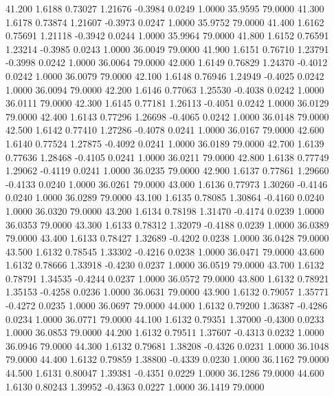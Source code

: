   41.200   1.6188   0.73027   1.21676  -0.3984   0.0249   1.0000  35.9595  79.0000
  41.300   1.6178   0.73874   1.21607  -0.3973   0.0247   1.0000  35.9752  79.0000
  41.400   1.6162   0.75691   1.21118  -0.3942   0.0244   1.0000  35.9964  79.0000
  41.800   1.6152   0.76591   1.23214  -0.3985   0.0243   1.0000  36.0049  79.0000
  41.900   1.6151   0.76710   1.23791  -0.3998   0.0242   1.0000  36.0064  79.0000
  42.000   1.6149   0.76829   1.24370  -0.4012   0.0242   1.0000  36.0079  79.0000
  42.100   1.6148   0.76946   1.24949  -0.4025   0.0242   1.0000  36.0094  79.0000
  42.200   1.6146   0.77063   1.25530  -0.4038   0.0242   1.0000  36.0111  79.0000
  42.300   1.6145   0.77181   1.26113  -0.4051   0.0242   1.0000  36.0129  79.0000
  42.400   1.6143   0.77296   1.26698  -0.4065   0.0242   1.0000  36.0148  79.0000
  42.500   1.6142   0.77410   1.27286  -0.4078   0.0241   1.0000  36.0167  79.0000
  42.600   1.6140   0.77524   1.27875  -0.4092   0.0241   1.0000  36.0189  79.0000
  42.700   1.6139   0.77636   1.28468  -0.4105   0.0241   1.0000  36.0211  79.0000
  42.800   1.6138   0.77749   1.29062  -0.4119   0.0241   1.0000  36.0235  79.0000
  42.900   1.6137   0.77861   1.29660  -0.4133   0.0240   1.0000  36.0261  79.0000
  43.000   1.6136   0.77973   1.30260  -0.4146   0.0240   1.0000  36.0289  79.0000
  43.100   1.6135   0.78085   1.30864  -0.4160   0.0240   1.0000  36.0320  79.0000
  43.200   1.6134   0.78198   1.31470  -0.4174   0.0239   1.0000  36.0353  79.0000
  43.300   1.6133   0.78312   1.32079  -0.4188   0.0239   1.0000  36.0389  79.0000
  43.400   1.6133   0.78427   1.32689  -0.4202   0.0238   1.0000  36.0428  79.0000
  43.500   1.6132   0.78545   1.33302  -0.4216   0.0238   1.0000  36.0471  79.0000
  43.600   1.6132   0.78666   1.33918  -0.4230   0.0237   1.0000  36.0519  79.0000
  43.700   1.6132   0.78791   1.34535  -0.4244   0.0237   1.0000  36.0572  79.0000
  43.800   1.6132   0.78921   1.35153  -0.4258   0.0236   1.0000  36.0631  79.0000
  43.900   1.6132   0.79057   1.35771  -0.4272   0.0235   1.0000  36.0697  79.0000
  44.000   1.6132   0.79200   1.36387  -0.4286   0.0234   1.0000  36.0771  79.0000
  44.100   1.6132   0.79351   1.37000  -0.4300   0.0233   1.0000  36.0853  79.0000
  44.200   1.6132   0.79511   1.37607  -0.4313   0.0232   1.0000  36.0946  79.0000
  44.300   1.6132   0.79681   1.38208  -0.4326   0.0231   1.0000  36.1048  79.0000
  44.400   1.6132   0.79859   1.38800  -0.4339   0.0230   1.0000  36.1162  79.0000
  44.500   1.6131   0.80047   1.39381  -0.4351   0.0229   1.0000  36.1286  79.0000
  44.600   1.6130   0.80243   1.39952  -0.4363   0.0227   1.0000  36.1419  79.0000
